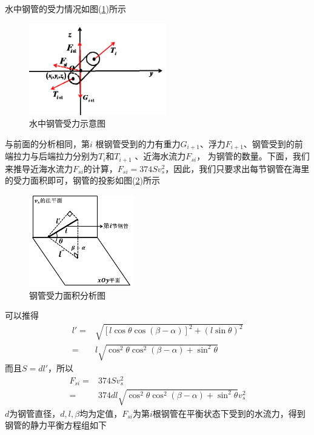             水中钢管的受力情况如图(\ref{水中钢管受力示意图})所示
            \begin{figure}[H]
            \centering
            \includegraphics[height=4cm]{images/water_pipe_force.jpg}
            \caption{水中钢管受力示意图}
            \label{水中钢管受力示意图}
            \end{figure}
            \par
            与前面的分析相同，第$i$ 根钢管受到的力有重力$G_{i+1}$、浮力$F_{i+1}$、钢管受到的前端拉力与后端拉力分别为$T_i$和$T_{i+1}$ 、近海水流力$F_{si}$， 为钢管的数量。下面，我们来推导近海水流力$F_{si}$的计算，$F_{si} = 374Sv_s^2$，因此，我们只要求出每节钢管在海里的受力面积即可，钢管的投影如图(\ref{钢管受力面积分析图})所示
            \begin{figure}[H]
            \centering
            \includegraphics[height=4cm]{images/Steel_pipe_force_area.jpg}
            \caption{钢管受力面积分析图}
            \label{钢管受力面积分析图}
            \end{figure}
            可以推得
            \begin{align*}
            l' =&  \sqrt{[l\cos\theta\cos(\beta-\alpha)]^2+(l\sin\theta)^2}\\
            =& l\sqrt{\cos^2\theta\cos^2(\beta-\alpha)+\sin^2\theta}
            \end{align*}
            而且$S = dl'$，所以
            \begin{align*}
            F_{si} =&  374S v_s^2\\
            =& 374dl\sqrt{\cos^2\theta\cos^2(\beta-\alpha)+\sin^2\theta}v_s^2
            \end{align*}
            $d$为钢管直径，$d,l,\beta$均为定值，$F_{si}$为第$i$根钢管在平衡状态下受到的水流力，得到钢管的静力平衡方程组如下
